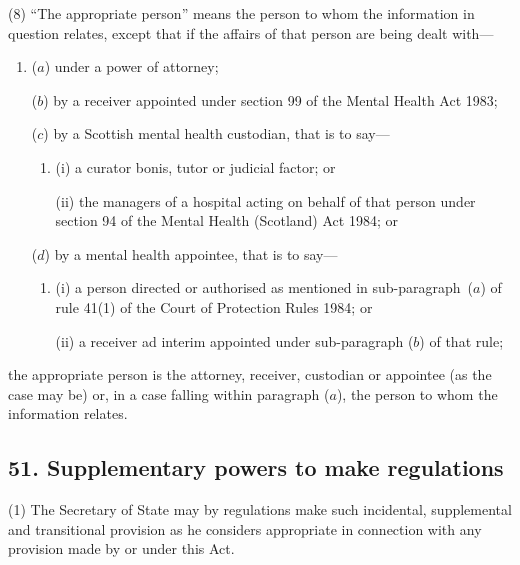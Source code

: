 \documentclass[12pt,a4paper]{article}
\begin{document}
(8) “The appropriate person” means the person to whom the information in question relates, except that if the affairs of that person are being dealt with—
\begin{enumerate}\item[]
($a$) under a power of attorney;

($b$) by a receiver appointed under section 99 of the Mental Health Act 1983;

($c$) by a Scottish mental health custodian, that is to say—
\begin{enumerate}\item[]
(i) a curator bonis, tutor or judicial factor; or

(ii) the managers of a hospital acting on behalf of that person under section 94 of the Mental Health (Scotland) Act 1984; or
\end{enumerate}

($d$) by a mental health appointee, that is to say—
\begin{enumerate}\item[]
(i) a person directed or authorised as mentioned in sub-\hspace{0pt}paragraph~($a$)  of rule 41(1)  of the Court of Protection Rules 1984; or

(ii) a receiver ad interim appointed under sub-paragraph ($b$)  of that rule;
\end{enumerate}
\end{enumerate}
the appropriate person is the attorney, receiver, custodian or appointee (as the case may be) or, in a case falling within paragraph ($a$), the person to whom the information relates.


\subsection{51. Supplementary powers to make regulations}

(1) The Secretary of State may by regulations make such incidental, supplemental and transitional provision as he considers appropriate in connection with any provision made by or under this Act.
\end{document}
